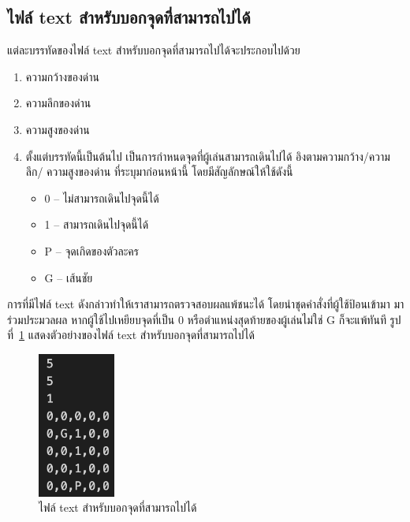 \subsection{ไฟล์ text สำหรับบอกจุดที่สามารถไปได้}
แต่ละบรรทัดของไฟล์ text สำหรับบอกจุดที่สามารถไปได้จะประกอบไปด้วย
\begin{enumerate}
    \item ความกว้างของด่าน
    \item ความลึกของด่าน
    \item ความสูงของด่าน
    \item ตั้งแต่บรรทัดนี้เป็นต้นไป เป็นการกำหนดจุดที่ผู้เล่นสามารถเดินไปได้ อิงตามความกว้าง/ความลึก/ \newline ความสูงของด่าน ที่ระบุมาก่อนหน้านี้ โดยมีสัญลักษณ์ให้ใช้ดังนี้
    \begin{itemize}
        \item 0 -- ไม่สามารถเดินไปจุดนี้ได้
        \item 1 -- สามารถเดินไปจุดนี้ได้
        \item P -- จุดเกิดของตัวละคร
        \item G -- เส้นชัย
    \end{itemize}
\end{enumerate}
การที่มีไฟล์ text ดังกล่าวทำให้เราสามารถตรวจสอบผลแพ้ชนะได้ โดยนำชุดคำสั่งที่ผู้ใช้ป้อนเข้ามา มาร่วมประมวลผล หากผู้ใช้ไปเหยียบจุดที่เป็น 0
หรือตำแหน่งสุดท้ายของผู้เล่นไม่ใช่ G ก็จะแพ้ทันที รูปที่~\ref{ft2} แสดงตัวอย่างของไฟล์ text สำหรับบอกจุดที่สามารถไปได้
\begin{figure}[h!]
    \begin{center}
    \includegraphics[width=1in]{pic-toro/filetext1.png}
    \end{center}
    \caption[ไฟล์ text สำหรับบอกจุดที่สามารถไปได้]{ไฟล์ text สำหรับบอกจุดที่สามารถไปได้}
    \label{ft2}
    \end{figure}
